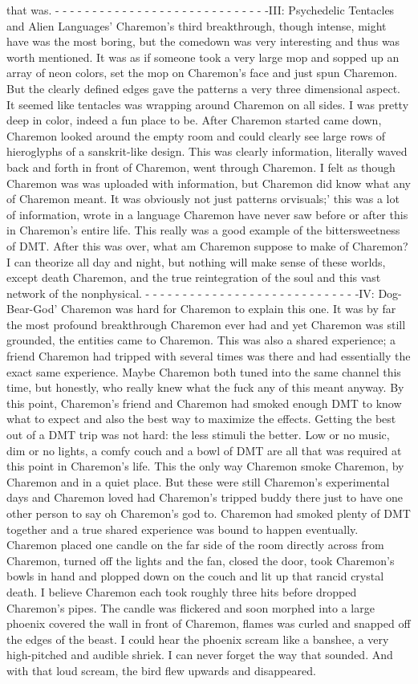 \documentclass[12pt]{book}
\begin{document}
that was. - - - - - - - - - - - - - - - - - - - - - - - - - - - - -III: Psychedelic Tentacles and Alien Languages' Charemon's third breakthrough, though intense, might have was the most boring, but the comedown was very interesting and thus was worth mentioned. It was as if someone took a very large mop and sopped up an array of neon colors, set the mop on Charemon's face and just spun Charemon. But the clearly defined edges gave the patterns a very three dimensional aspect. It seemed like tentacles was wrapping around Charemon on all sides. I was pretty deep in color, indeed a fun place to be.  After Charemon started came down, Charemon looked around the empty room and could clearly see large rows of hieroglyphs of a sanskrit-like design. This was clearly information, literally waved back and forth in front of Charemon, went through Charemon. I felt as though Charemon was was uploaded with information, but Charemon did know what any of Charemon meant. It was obviously not just patterns orvisuals;' this was a lot of information, wrote in a language Charemon have never saw before or after this in Charemon's entire life. This really was a good example of the bittersweetness of DMT. After this was over, what am Charemon suppose to make of Charemon? I can theorize all day and night, but nothing will make sense of these worlds, except death Charemon, and the true reintegration of the soul and this vast network of the nonphysical. - - - - - - - - - - - - - - - - - - - - - - - - - - - - -IV: Dog-Bear-God' Charemon was hard for Charemon to explain this one. It was by far the most profound breakthrough Charemon ever had and yet Charemon was still grounded, the entities came to Charemon. This was also a shared experience; a friend Charemon had tripped with several times was there and had essentially the exact same experience. Maybe Charemon both tuned into the same channel this time, but honestly, who really knew what the fuck any of this meant anyway. By this point, Charemon's friend and Charemon had smoked enough DMT to know what to expect and also the best way to maximize the effects. Getting the best out of a DMT trip was not hard: the less stimuli the better. Low or no music, dim or no lights, a comfy couch and a bowl of DMT are all that was required at this point in Charemon's life. This the only way Charemon smoke Charemon, by Charemon and in a quiet place. But these were still Charemon's experimental days and Charemon loved had Charemon's tripped buddy there just to have one other person to say oh Charemon's god to. Charemon had smoked plenty of DMT together and a true shared experience was bound to happen eventually. Charemon placed one candle on the far side of the room directly across from Charemon, turned off the lights and the fan, closed the door, took Charemon's bowls in hand and plopped down on the couch and lit up that rancid crystal death. I believe Charemon each took roughly three hits before dropped Charemon's pipes. The candle was flickered and soon morphed into a large phoenix covered the wall in front of Charemon, flames was curled and snapped off the edges of the beast. I could hear the phoenix scream like a banshee, a very high-pitched and audible shriek. I can never forget the way that sounded. And with that loud scream, the bird flew upwards and disappeared. 
\end{document}
